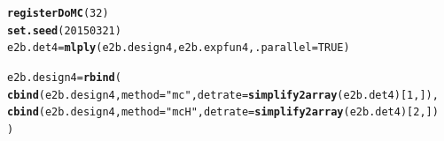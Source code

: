 \documentclass{article}\usepackage[]{graphicx}\usepackage[]{color}
\makeatletter
\newcommand{\hlnum}[1]{\textcolor[rgb]{0.686,0.059,0.569}{#1}}%
\newcommand{\hlstr}[1]{\textcolor[rgb]{0.192,0.494,0.8}{#1}}%
\newcommand{\hlstd}[1]{\textcolor[rgb]{0.345,0.345,0.345}{#1}}%
\newcommand{\hlkwb}[1]{\textcolor[rgb]{0.69,0.353,0.396}{#1}}%
\newcommand{\hlkwc}[1]{\textcolor[rgb]{0.333,0.667,0.333}{#1}}%
\newcommand{\hlkwd}[1]{\textcolor[rgb]{0.737,0.353,0.396}{\textbf{#1}}}%
\newenvironment{kframe}{%
 \def\at@end@of@kframe{}%
 \ifinner\ifhmode%
  \def\at@end@of@kframe{\end{minipage}}%
  \begin{minipage}{\columnwidth}%
 \fi\fi%
 \def\FrameCommand##1{\hskip\@totalleftmargin \hskip-\fboxsep
 \colorbox{shadecolor}{##1}\hskip-\fboxsep
     \hskip-\linewidth \hskip-\@totalleftmargin \hskip\columnwidth}%
 \MakeFramed {\advance\hsize-\width
   \@totalleftmargin\z@ \linewidth\hsize
   \@setminipage}}%
 {\par\unskip\endMakeFramed%
 \at@end@of@kframe}
\newenvironment{knitrout}{}{} %
\makeatother
\begin{document}
\begin{knitrout}
\begin{kframe}
\begin{alltt}
\hlkwd{registerDoMC}\hlstd{(}\hlnum{32}\hlstd{)}
\hlkwd{set.seed}\hlstd{(}\hlnum{20150321}\hlstd{)}
\hlstd{e2b.det4} \hlkwb{=} \hlkwd{mlply}\hlstd{(e2b.design4, e2b.expfun4,} \hlkwc{.parallel} \hlstd{=} \hlnum{TRUE}\hlstd{)}

\hlstd{e2b.design4} \hlkwb{=} \hlkwd{rbind}\hlstd{(}
        \hlkwd{cbind}\hlstd{(e2b.design4,} \hlkwc{method} \hlstd{=} \hlstr{"mc"}\hlstd{,} \hlkwc{detrate} \hlstd{=} \hlkwd{simplify2array}\hlstd{(e2b.det4)[}\hlnum{1}\hlstd{,]),}
        \hlkwd{cbind}\hlstd{(e2b.design4,} \hlkwc{method} \hlstd{=} \hlstr{"mcH"}\hlstd{,} \hlkwc{detrate} \hlstd{=} \hlkwd{simplify2array}\hlstd{(e2b.det4)[}\hlnum{2}\hlstd{,])}
\hlstd{)}
\end{alltt}
\end{kframe}
\end{knitrout}
\end{document}
